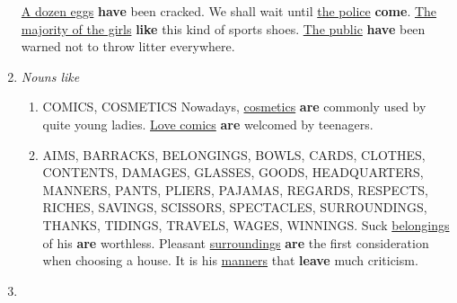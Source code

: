 \begin{enumerate}
        \newline
        \newline
        \underline{A dozen eggs} \textbf{have} been cracked.
        \newline
        \newline
        We shall wait until \underline{the police} \textbf{come}.
        \newline
        \newline
        \underline{The majority of the girls} \textbf{like} this kind of sports
        shoes.
        \newline
        \newline
        \underline{The public} \textbf{have} been warned not to throw litter
        everywhere.
    \item
        {\it
        Nouns like
        }
        \begin{enumerate}
            \item COMICS, COSMETICS
                \newline
                \newline
                Nowadays, \underline{cosmetics} \textbf{are} commonly used by
                quite young ladies.
                \newline
                \newline
                \underline{Love comics} \textbf{are} welcomed by teenagers.
            \item AIMS, BARRACKS, BELONGINGS, BOWLS, CARDS, CLOTHES, CONTENTS,
                DAMAGES, GLASSES, GOODS, HEADQUARTERS, MANNERS, PANTS, PLIERS,
                PAJAMAS, REGARDS, RESPECTS, RICHES, SAVINGS, SCISSORS,
                SPECTACLES, SURROUNDINGS, THANKS, TIDINGS, TRAVELS, WAGES,
                WINNINGS.
                \newline
                \newline
                Suck \underline{belongings} of his \textbf{are} worthless.
                \newline
                \newline
                Pleasant \underline{surroundings} \textbf{are} the first
                consideration when choosing a house.
                \newline
                \newline
                It is his \underline{manners} that \textbf{leave} much
                criticism.
        \end{enumerate}
    \item

\end{enumerate}
